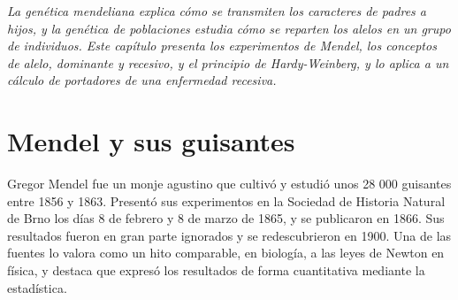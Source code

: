 \documentclass{book}
\begin{document}
\noindent\textit{La genética mendeliana explica cómo se transmiten los caracteres de padres a hijos, y la genética de poblaciones estudia cómo se reparten los alelos en un grupo de individuos. Este capítulo presenta los experimentos de Mendel, los conceptos de alelo, dominante y recesivo, y el principio de Hardy-Weinberg, y lo aplica a un cálculo de portadores de una enfermedad recesiva.}


\section{Mendel y sus guisantes}

Gregor Mendel fue un monje agustino que cultivó y estudió unos 28 000 guisantes entre 1856 y 1863. Presentó sus experimentos en la Sociedad de Historia Natural de Brno los días 8 de febrero y 8 de marzo de 1865, y se publicaron en 1866. Sus resultados fueron en gran parte ignorados y se redescubrieron en 1900. Una de las fuentes lo valora como un hito comparable, en biología, a las leyes de Newton en física, y destaca que expresó los resultados de forma cuantitativa mediante la estadística.

\end{document}
